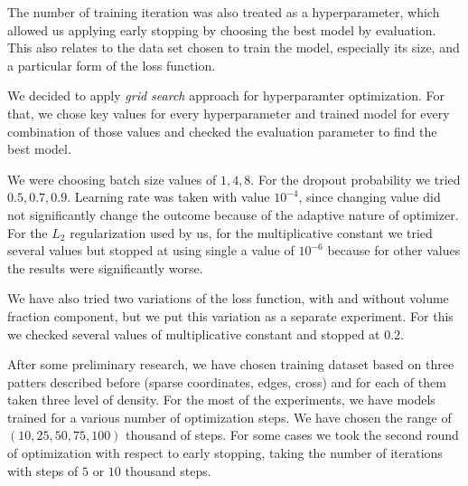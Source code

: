The number of training iteration was also treated as a hyperparameter, which allowed us applying early stopping by choosing the best model by evaluation.
This also relates to the data set chosen to train the model, especially its size, and a particular form of the loss function. 
\medskip

We decided to apply \emph{grid search} approach for hyperparamter optimization\cite{}.
For that, we chose key values for every hyperparameter and trained model for every combination of those values and checked the evaluation parameter to find the best model.
\medskip

We were choosing batch size values of $1,4,8$.
For the dropout probability we tried $0.5,0.7,0.9$.
Learning rate was taken with value $10^{-4}$, since changing value did not significantly change the outcome because of the adaptive nature of optimizer.
For the $L_2$ regularization used by us, for the multiplicative constant we tried several values but stopped at using single a value of $10^{-6}$ because for other values the results were significantly worse. 

We have also tried two variations of the loss function, with and without volume fraction component, but we put this variation as a separate experiment. 
For this we checked several values of multiplicative constant and stopped at $0.2$.
\medskip

After some preliminary research, we have chosen training dataset based on three patters described before (sparse coordinates, edges, cross) and for each of them taken three level of density.
For the most of the experiments, we have models trained for a various number of optimization steps. We have chosen the range of $(10, 25, 50, 75, 100)$ thousand of steps.
For some cases we took the second round of optimization with respect to early stopping, taking the number of iterations with steps of $5$ or $10$ thousand steps.


